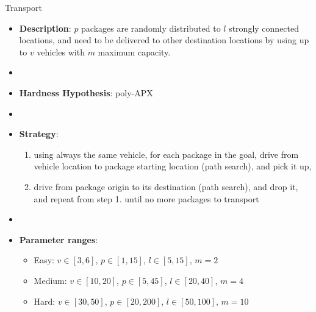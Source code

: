 \documentclass[aspectratio=169,xcolor=dvipsnames]{beamer}
\begin{document}
\begin{frame}{Transport}
    \begin{itemize}
        \item \textbf{Description}:  $p$ packages are randomly distributed to $l$ strongly connected locations, and need to be delivered to other destination locations by using up to $v$ vehicles with $m$ maximum capacity.
        \item[]
        \item \textbf{Hardness Hypothesis}: poly-APX %
        \item[]
        \item \textbf{Strategy}:
        \begin{enumerate}
            \item using always the same vehicle, for each package in the goal, drive from vehicle location to package starting location (path search), and pick it up,
            \item drive from package origin to its destination (path search), and drop it, and repeat from step 1. until no more packages to transport
        \end{enumerate}
        \item[]
        \item \textbf{Parameter ranges}:
        \begin{itemize}
            \item Easy: $v\in[3, 6]$, $p\in[1, 15]$, $l\in[5, 15]$, $m=2$
            \item Medium: $v\in[10, 20]$, $p\in[5, 45]$, $l\in[20, 40]$, $m=4$
            \item Hard: $v\in[30, 50]$, $p\in[20, 200]$, $l\in[50, 100]$, $m=10$
        \end{itemize}
    \end{itemize}
\end{frame}
\end{document}
